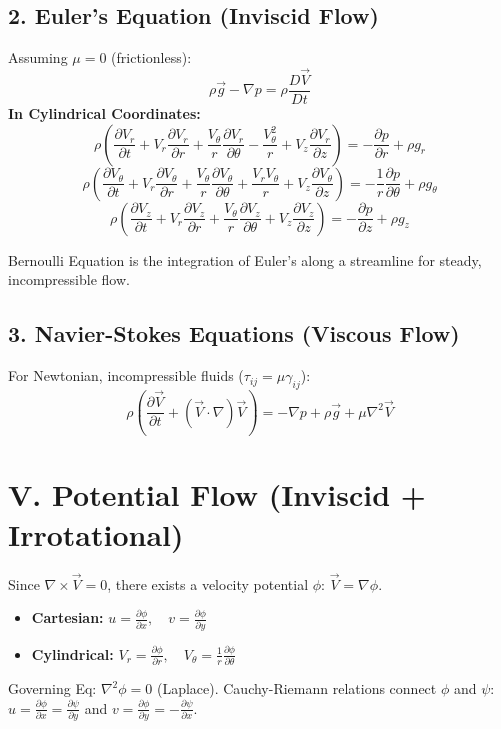 \documentclass[9pt, a4paper, twocolumn]{article}
\begin{document}
\subsection{2. Euler's Equation (Inviscid Flow)}
Assuming $\mu = 0$ (frictionless):
\begin{equation*}
    \rho \vec{g} - \nabla p = \rho \frac{D\vec{V}}{Dt}
\end{equation*}
\textbf{In Cylindrical Coordinates:}
\begin{equation*}
    \rho \left( \frac{\partial V_r}{\partial t} + V_r \frac{\partial V_r}{\partial r} + \frac{V_\theta}{r} \frac{\partial V_r}{\partial \theta} - \frac{V_\theta^2}{r} + V_z \frac{\partial V_r}{\partial z} \right) = -\frac{\partial p}{\partial r} + \rho g_r
\end{equation*}
\begin{equation*}
    \rho \left( \frac{\partial V_\theta}{\partial t} + V_r \frac{\partial V_\theta}{\partial r} + \frac{V_\theta}{r} \frac{\partial V_\theta}{\partial \theta} + \frac{V_r V_\theta}{r} + V_z \frac{\partial V_\theta}{\partial z} \right) = -\frac{1}{r} \frac{\partial p}{\partial \theta} + \rho g_\theta
\end{equation*}
\begin{equation*}
    \rho \left( \frac{\partial V_z}{\partial t} + V_r \frac{\partial V_z}{\partial r} + \frac{V_\theta}{r} \frac{\partial V_z}{\partial \theta} + V_z \frac{\partial V_z}{\partial z} \right) = -\frac{\partial p}{\partial z} + \rho g_z
\end{equation*}

Bernoulli Equation is the integration of Euler's along a streamline for steady, incompressible flow.

\subsection{3. Navier-Stokes Equations (Viscous Flow)}
For Newtonian, incompressible fluids ($\tau_{ij} = \mu \gamma_{ij}$):
\begin{equation*}
    \rho \left( \frac{\partial \vec{V}}{\partial t} + (\vec{V} \cdot \nabla)\vec{V} \right) = -\nabla p + \rho \vec{g} + \mu \nabla^2 \vec{V}
\end{equation*}

\section{V. Potential Flow (Inviscid + Irrotational)}
Since $\nabla \times \vec{V} = 0$, there exists a velocity potential $\phi$: $\vec{V} = \nabla \phi$.
\begin{itemize}
    \item \textbf{Cartesian:} $u = \frac{\partial \phi}{\partial x}, \quad v = \frac{\partial \phi}{\partial y}$
    \item \textbf{Cylindrical:} $V_r = \frac{\partial \phi}{\partial r}, \quad V_\theta = \frac{1}{r}\frac{\partial \phi}{\partial \theta}$
\end{itemize}
Governing Eq: $\nabla^2 \phi = 0$ (Laplace). Cauchy-Riemann relations connect $\phi$ and $\psi$: $u = \frac{\partial \phi}{\partial x} = \frac{\partial \psi}{\partial y}$ and $v = \frac{\partial \phi}{\partial y} = -\frac{\partial \psi}{\partial x}$.
\end{document}
